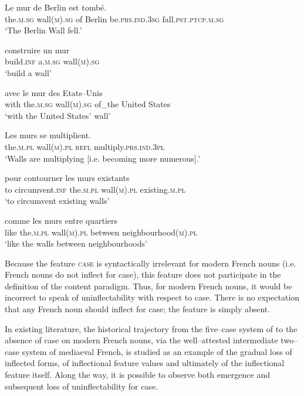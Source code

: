 \documentclass[output=paper,colorlinks,citecolor=brown]{langscibook}
\begin{document}
\begin{exe}
	\ex \label{06ex5}
	\begin{xlist}
		\ex \label{06ex5a}
		\gll Le mur de Berlin est tombé. \\
		the.\textsc{m.sg} wall\textsc{(m).sg} of Berlin be.\textsc{prs.ind.3sg} fall.\textsc{pst.ptcp.m.sg} \\
		\trans ‘The Berlin Wall fell.’
		
		\ex \label{06ex5b}
		\gll construire un mur \\
		build.\textsc{inf} a.\textsc{m.sg} wall\textsc{(m).sg} \\
		\trans ‘build a wall’
		
		\ex \label{06ex5c}
		\gll avec le mur des Etats–Unis \\
		with the.\textsc{m.sg} wall\textsc{(m).sg} of\_the {United States} \\
		\trans ‘with the United States’ wall’
		
		\ex \label{06ex5d}
		\gll Les murs se multiplient. \\
		the.\textsc{m.pl} wall\textsc{(m).pl} \textsc{refl} multiply.\textsc{prs.ind.3pl} \\
		\trans ‘Walls are multiplying [i.e. becoming more numerous].’
		
		\ex \label{06ex5e}
		\gll pour contourner les murs existants \\
		to circumvent.\textsc{inf} the.\textsc{m.pl} wall\textsc{(m).pl} existing.\textsc{m.pl} \\
		\trans ‘to circumvent existing walls’
		
		\ex \label{06ex5f}
		\gll comme les murs entre quartiers \\
		like the.\textsc{m.pl} wall\textsc{(m).pl} between neighbourhood\textsc{(m).pl} \\
		\trans ‘like the walls between neighbourhoods’
	\end{xlist}
\end{exe}

Because the feature \textsc{case} is syntactically irrelevant for modern French nouns (i.e. French nouns do not inflect for case), this feature does not participate in the definition of the content paradigm. Thus, for modern French nouns, it would be incorrect to speak of uninflectability with respect to case. There is no expectation that any French noun should inflect for case; the feature is simply absent.

In existing literature, the historical trajectory from the five--case system of  to the absence of case on modern French nouns, via the well--attested intermediate two--case system of mediaeval French, is studied as an example of the gradual loss of inflected forms, of inflectional feature values and ultimately of the inflectional feature itself. Along the way, it is possible to observe both emergence and subsequent loss of uninflectability for case.
\end{document}
